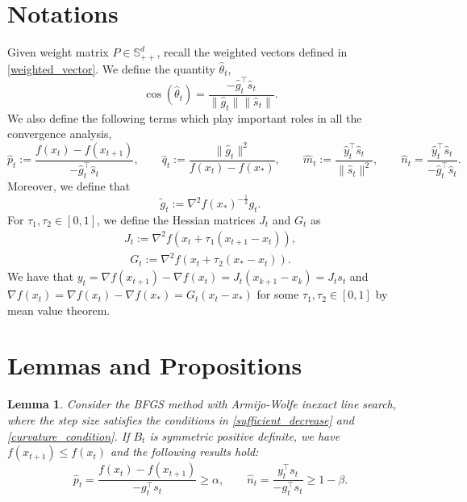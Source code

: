 \documentclass[11pt,letterpaper]{article}
\newcommand\0{{\Vector{0}}}
\newcommand\1{{\Vector{1}}}
\newtheorem{lemma}[theorem]{Lemma}
\numberwithin{assumption}{section}
\numberwithin{definition}{section}
\numberwithin{theorem}{section}
\numberwithin{remark}{section}
\begin{document}
\section{Notations}

Given weight matrix $P\in \mathbb{S}^d_{++}$, recall the weighted vectors defined in \eqref{weighted_vector}. We define the quantity $\hat{\theta}_t$, 
\begin{equation}\label{eq:theta}
    \cos(\hat{\theta}_t) = \frac{-\hat{g}_t^\top \hat{s}_t}{\|\hat{g}_t\|\|\hat{s}_t\|}.
\end{equation}
We also define the following terms which play important roles in all the convergence analysis,
\begin{equation}\label{eq:def_alpha_q_m}
    \hat{p}_t := \frac{f(x_t)-f(x_{t+1})}{-\hat{g}_t^\top \hat{s}_t}, \qquad \hat{q}_t := \frac{\|\hat{g}_t\|^2}{f(x_t)-f(x_*)}, \qquad \hat{m}_t := \frac{\hat{y}_t^\top \hat{s}_t}{\|\hat{s}_t\|^2}, \qquad \hat{n}_t= \frac{\hat{y}_t^\top \hat{s}_t}{-\hat{g}_t^\top \hat{s}_t}. 
\end{equation}
Moreover, we define that
\begin{equation}\label{definition_g}
    \tilde{g}_t := \nabla^2{f(x_*)}^{-\frac{1}{2}}g_t.
\end{equation}
For $\tau_1, \tau_2 \in [0, 1]$, we define the Hessian matrices $J_t$ and $G_t$ as 
\begin{align}\label{def_J}
    J_t := \nabla^2{f(x_t + \tau_1 (x_{t + 1} - x_t))},
\end{align}
\begin{align}\label{def_G}
    G_t := \nabla^2{f(x_t + \tau_2 (x_{*} - x_t))}.
\end{align}
We have that $y_t = \nabla f(x_{t + 1}) - \nabla f(x_t) = J_t(x_{k + 1} - x_k) = J_ts_t$ and $\nabla{f(x_t)} = \nabla{f(x_t)} - \nabla{f(x_*)} = G_t(x_t - x_*)$ for some $\tau_1, \tau_2 \in [0, 1]$ by mean value theorem.

\section{Lemmas and Propositions}

\begin{lemma}\label{lemma_line_search}
    Consider the BFGS method with Armijo-Wolfe inexact line search, where the step size satisfies the conditions in  \eqref{sufficient_decrease} and \eqref{curvature_condition}. If $B_t$ is symmetric positive definite, we have $f(x_{t + 1}) \leq f(x_t)$ and the following results hold:
    \begin{equation}
        \hat{p}_t = \frac{f(x_t)-f(x_{t + 1})}{-{g}_t^\top {s}_t} \geq \alpha, \qquad \hat{n}_t = \frac{{y}_t^\top {s}_t}{- {g}_t^\top {s}_t} \geq 1 - \beta.
    \end{equation}
\end{lemma}
\end{document}
